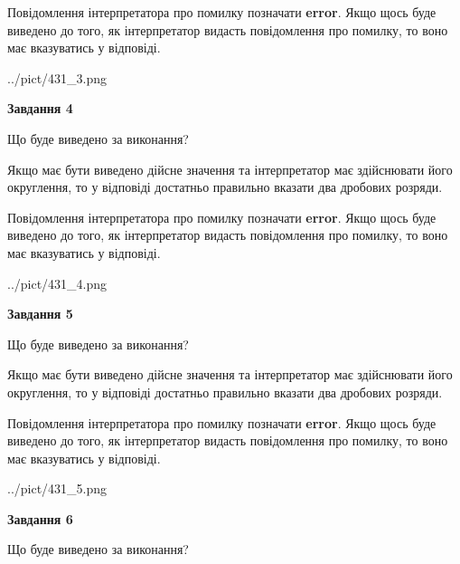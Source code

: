 \documentclass[12pt, ukrainian]{article}
\begin{document}
{\begin {Large}
Повідомлення інтерпретатора про помилку позначати \textbf{error}.
Якщо щось буде виведено до того, як інтерпретатор видасть повідомлення про помилку, 
то воно має вказуватись у відповіді. \par

\begin{center}
	{../pict/431_3.png}
\end{center}
\newpage

{\begin {center}\textbf{Завдання 4}\end {center}}\par
Що буде виведено за виконання? \par

Якщо має бути виведено дійсне значення та інтерпретатор має здійснювати його округлення, 
то у відповіді достатньо правильно вказати два дробових розряди.

Повідомлення інтерпретатора про помилку позначати \textbf{error}.
Якщо щось буде виведено до того, як інтерпретатор видасть повідомлення про помилку, 
то воно має вказуватись у відповіді. \par

\begin{center}
	{../pict/431_4.png}
\end{center}
\newpage

{\begin {center}\textbf{Завдання 5}\end {center}}\par
Що буде виведено за виконання? \par

Якщо має бути виведено дійсне значення та інтерпретатор має здійснювати його округлення, 
то у відповіді достатньо правильно вказати два дробових розряди.

Повідомлення інтерпретатора про помилку позначати \textbf{error}.
Якщо щось буде виведено до того, як інтерпретатор видасть повідомлення про помилку, 
то воно має вказуватись у відповіді. \par

\begin{center}
	{../pict/431_5.png}
\end{center}
\newpage

{\begin {center}\textbf{Завдання 6}\end {center}}\par
Що буде виведено за виконання? \par


\end{Large}}
\end{document}
